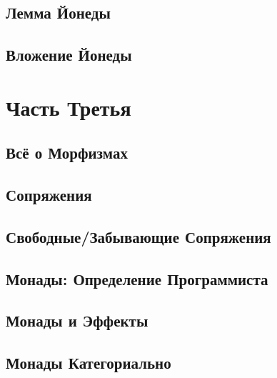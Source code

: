 \chapter{Лемма Йонеды}\label{the-yoneda-lemma}


\chapter{Вложение Йонеды}\label{yoneda-embedding}


\part*{Часть Третья}

\chapter{Всё о Морфизмах}\label{all-about-morphisms}


\chapter{Сопряжения}\label{adjunctions}


\chapter{Свободные/Забывающие Сопряжения}\label{free-forgetful-adjunctions}


\chapter{Монады: Определение Программиста}\label{monads-programmers-definition}


\chapter{Монады и Эффекты}\label{monads-and-effects}


\chapter{Монады Категориально}\label{monads-categorically}


